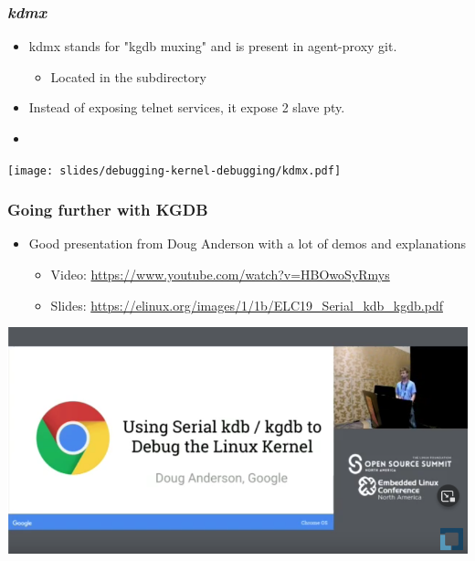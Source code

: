 \begin{frame}
  \frametitle{{\em kdmx}}
  \begin{itemize}
    \item kdmx stands for "kgdb muxing" and is present in agent-proxy git.
    \begin{itemize}
      \item Located in the subdirectory 
    \end{itemize}
    \item Instead of exposing telnet services, it expose 2 slave pty.
    \item {}
  \end{itemize}
  \center\texttt{[image: slides/debugging-kernel-debugging/kdmx.pdf]}
\end{frame}

\begin{frame}[fragile]
  \frametitle{Going further with KGDB}
  \begin{itemize}
    \item Good presentation from Doug Anderson with a lot of demos and
          explanations
    \begin{itemize}
      \item Video: \url{https://www.youtube.com/watch?v=HBOwoSyRmys}
      \item Slides: \url{https://elinux.org/images/1/1b/ELC19_Serial_kdb_kgdb.pdf}
    \end{itemize}
  \end{itemize}
  \vspace{0.5cm}
  \begin{center}
  \center\includegraphics[height=0.5\textheight]{slides/debugging-kernel-debugging/kgdb_conf.png}
  \end{center}
\end{frame}



